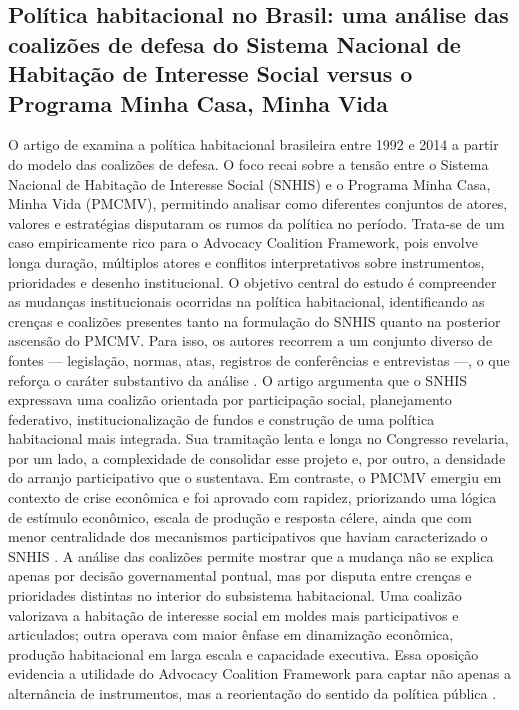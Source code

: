 \documentclass[12pt,a4paper]{article}
\begin{document}
\subsection{Política habitacional no Brasil: uma análise das coalizões de defesa do Sistema Nacional de Habitação de Interesse Social versus o Programa Minha Casa, Minha Vida}
\label{sec:orgc0747d3}
O artigo de \textcite{ferreira2019habitacional} examina a política habitacional brasileira entre 1992 e 2014 a partir do modelo das coalizões de defesa. O foco recai sobre a tensão entre o Sistema Nacional de Habitação de Interesse Social (SNHIS) e o Programa Minha Casa, Minha Vida (PMCMV), permitindo analisar como diferentes conjuntos de atores, valores e estratégias disputaram os rumos da política no período. Trata-se de um caso empiricamente rico para o Advocacy Coalition Framework, pois envolve longa duração, múltiplos atores e conflitos interpretativos sobre instrumentos, prioridades e desenho institucional.
O objetivo central do estudo é compreender as mudanças institucionais ocorridas na política habitacional, identificando as crenças e coalizões presentes tanto na formulação do SNHIS quanto na posterior ascensão do PMCMV. Para isso, os autores recorrem a um conjunto diverso de fontes — legislação, normas, atas, registros de conferências e entrevistas —, o que reforça o caráter substantivo da análise \autocite{ferreira2019habitacional}.
O artigo argumenta que o SNHIS expressava uma coalizão orientada por participação social, planejamento federativo, institucionalização de fundos e construção de uma política habitacional mais integrada. Sua tramitação lenta e longa no Congresso revelaria, por um lado, a complexidade de consolidar esse projeto e, por outro, a densidade do arranjo participativo que o sustentava. Em contraste, o PMCMV emergiu em contexto de crise econômica e foi aprovado com rapidez, priorizando uma lógica de estímulo econômico, escala de produção e resposta célere, ainda que com menor centralidade dos mecanismos participativos que haviam caracterizado o SNHIS \autocite{ferreira2019habitacional}.
A análise das coalizões permite mostrar que a mudança não se explica apenas por decisão governamental pontual, mas por disputa entre crenças e prioridades distintas no interior do subsistema habitacional. Uma coalizão valorizava a habitação de interesse social em moldes mais participativos e articulados; outra operava com maior ênfase em dinamização econômica, produção habitacional em larga escala e capacidade executiva. Essa oposição evidencia a utilidade do Advocacy Coalition Framework para captar não apenas a alternância de instrumentos, mas a reorientação do sentido da política pública \autocites{ferreira2019habitacional}{araujoSilva2022coalizoes}.
\end{document}
